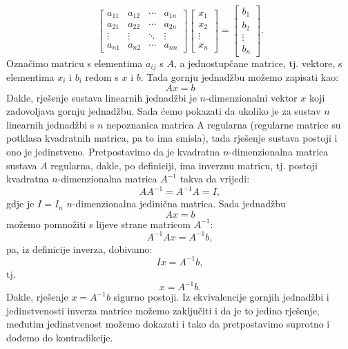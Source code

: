 \documentclass[a4paper,12pt,oneside]{article}
\begin{document}
$$  
 \left[\begin{matrix}a_{11} & a_{12} & \cdots & a_{1n}\\
	a_{21} & a_{22} & \cdots & a_{2n}\\
	\vdots & \vdots & \ddots & \vdots\\
	a_{n1} & a_{n2} & \cdots &a_{nn}\end{matrix}\right] \left[\begin{matrix}x_{1} \\ x_{2} \\ \vdots \\ x_{n}\end{matrix}\right]=\left[\begin{matrix}b_{1} \\ b_{2} \\ \vdots \\ b_{n}\end{matrix}\right].
$$
\newline
\noindent Označimo matricu s elementima $a_{ij}$ s $A$, a jednostupčane matrice, tj. vektore, s elementima $x_i$ i $b_i$ redom s $x$ i $b$. Tada gornju jednadžbu možemo zapisati kao:
$$Ax = b$$
\noindent Dakle, rješenje sustava linearnih jednadžbi je $n$-dimenzionalni vektor $x$ koji zadovoljava gornju jednadžbu.
   \newline\newline
\noindent Sada ćemo pokazati da ukoliko je za sustav $n$ linearnih jednadžbi s $n$ nepoznanica matrica A regularna (regularne matrice su potklasa kvadratnih matrica, pa to ima smisla), tada rješenje sustava postoji i ono je jedinstveno.
\newline\newline
\noindent Pretpostavimo da je kvadratna $n$-dimenzionalna matrica sustava $A$ regularna, dakle, po definiciji, ima inverznu matricu, tj. postoji kvadratna $n$-dimenzionalna matrica $A^{-1}$ takva da vrijedi:
$$AA^{-1} = A^{-1}A = I,$$
gdje je $I = I_n$ $n$-dimenzionalna jedinična matrica.
\newline\newline
\noindent Sada jednadžbu
$$Ax = b$$
možemo pomnožiti s lijeve strane matricom $A^{-1}$:
$$A^{-1}Ax = A^{-1}b,$$
pa, iz definicije inverza, dobivamo:
$$Ix = A^{-1}b,$$
tj.
$$x = A^{-1}b.$$
\noindent Dakle, rješenje $x = A^{-1}b$ sigurno postoji.
\newline\newline
\noindent Iz ekvivalencije gornjih jednadžbi i jedinstvenosti inverza matrice možemo zaključiti i da je to jedino rješenje, međutim jedinstvenost možemo dokazati i tako da pretpostavimo suprotno i dođemo do kontradikcije.\newline
\end{document}
